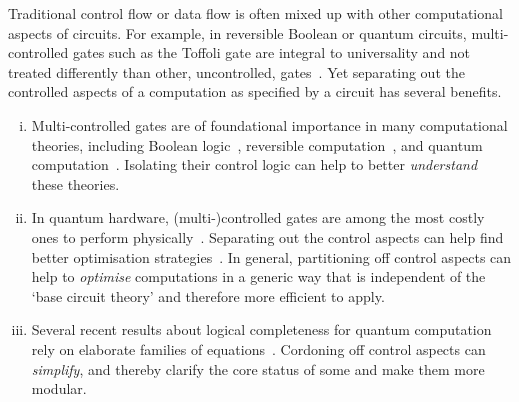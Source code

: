 \documentclass[a4paper]{article}
\theoremstyle{plain}
\theoremstyle{definition}
\begin{document}
Traditional control flow or data flow is often mixed up with other computational aspects of circuits.
For example, in reversible Boolean or quantum circuits, multi-controlled gates such as the Toffoli gate are integral to universality and not treated differently than other, uncontrolled, gates~\cite{toffoli}.
Yet separating out the controlled aspects of a computation as specified by a circuit has several benefits.
\begin{enumerate}[(i)]
 \item \label{challenge:understand}
 Multi-controlled gates are of foundational importance in many computational theories, including Boolean logic~\cite{vollmer:circuits}, reversible computation~\cite{toffoli,thomsenkaarsgaardsoeken:ricercar}, and quantum computation~\cite{shendeetal:synthesis}. Isolating their control logic can help to better \emph{understand} these theories.
 \item \label{challenge:optimise}
 In quantum hardware, (multi-)controlled gates are among the most costly ones to perform physically~\cite{barencoetal:gates,yuduanying:toffoli,chenetal:control}. Separating out the control aspects can help find better optimisation strategies~\cite{balaucaarusaoie:simulating}.
 In general, partitioning off control aspects can help to \emph{optimise} computations in a generic way that is independent of the `base circuit theory' and therefore more efficient to apply.
 \item \label{challenge:simplify}
 Several recent results about logical completeness for quantum computation rely on elaborate families of equations~\cite{bianselinger:cliffordt,bianselinger:unitaries,lirossselinger:orthogonal,clementetal:extensions,clementetal:minimal,clementetal:complete,clementetal:coherentcontrol,clementperdrix:pbs,fangetal:hadamardpi}. Cordoning off control aspects can \emph{simplify}, and thereby clarify the core status of some and make them more modular.
\end{enumerate}
\end{document}
